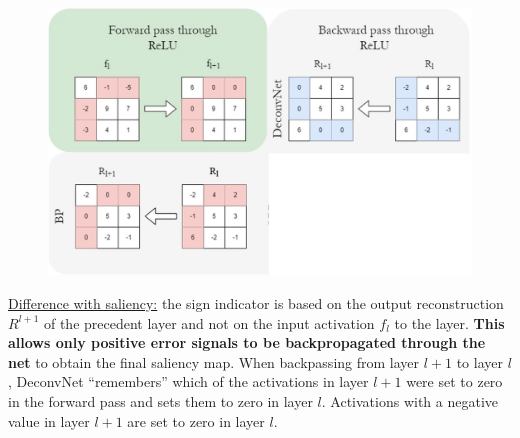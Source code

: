\begin{minipage}{0.55\textwidth}
    \begin{figure}[H]
        \includegraphics[width=\textwidth]{img/DeconvNet.png}
        \centering
    \end{figure}    
\end{minipage}
\hfill
\begin{minipage}{0.4\textwidth}
    \underline{Difference with saliency:} the sign indicator is based on the output reconstruction $R^{l+1}$ of the precedent layer and not on the input activation $f_l$ to the layer.
    \textbf{This allows only positive error signals to be backpropagated through the net} to obtain the final saliency map.
    When backpassing from layer $l+1$ to layer $l$, DeconvNet “remembers” which of the activations in layer $l+1$ were set to zero in the forward pass and sets them to zero in layer $l$. Activations with a
    negative value in layer $l+1$ are set to zero in layer $l$.
\end{minipage}

